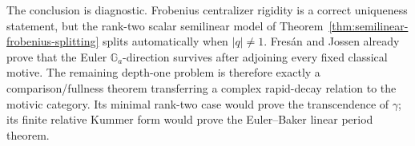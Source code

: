 The conclusion is diagnostic.  Frobenius centralizer rigidity is a correct
uniqueness statement, but the rank-two scalar semilinear model of
Theorem~\ref{thm:semilinear-frobenius-splitting} splits automatically when
\(|q|\ne1\).  Fres\'an and Jossen already prove that the
Euler $\mathbb G_a$-direction survives after adjoining every fixed
classical motive.  The remaining depth-one problem is therefore exactly a
comparison/fullness theorem transferring a complex rapid-decay relation to
the motivic category.  Its minimal rank-two case would prove the
transcendence of $\gamma$; its finite relative Kummer form would prove the
Euler--Baker linear period theorem.
